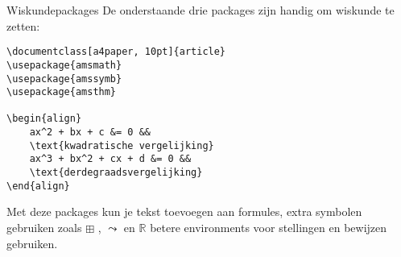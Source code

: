 \begin{frame}[fragile]{Wiskundepackages}
De onderstaande drie packages zijn handig om wiskunde te zetten:
\begin{verbatim}
\documentclass[a4paper, 10pt]{article}
\usepackage{amsmath}
\usepackage{amssymb}
\usepackage{amsthm}

\begin{align}
    ax^2 + bx + c &= 0 && 
    \text{kwadratische vergelijking} 
    ax^3 + bx^2 + cx + d &= 0 && 
    \text{derdegraadsvergelijking}
\end{align} 

\end{verbatim}

Met deze packages kun je tekst toevoegen aan formules, 
extra symbolen gebruiken zoals \( \boxplus \) , \( \leadsto \) en \(\mathbb{R}\) betere environments voor stellingen en bewijzen gebruiken.

\end{frame}